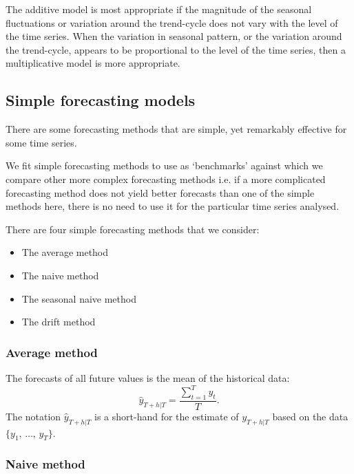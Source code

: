       \vspace{1em}

      The additive model is most appropriate if the magnitude of the seasonal fluctuations or variation around the trend-cycle does not vary with the level of the time series. When the variation in seasonal pattern, or the variation around the trend-cycle, appears to be proportional to the level of the time series, then a multiplicative model is more appropriate. 

   \subsection{Simple forecasting models}

      \cite{Watson2025} There are some forecasting methods that are simple, yet remarkably effective for some time series.

      \vspace{1em}
      
      We fit simple forecasting methods to use as `benchmarks' against which we compare other more complex forecasting methods i.e. if a more complicated forecasting method does not yield better forecasts than one of the simple methods here, there is no need to use it for the particular time series analysed.

      \vspace{1em}

      There are four simple forecasting methods that we consider:
      \begin{itemize}
         \item The average method
         \item The naive method
         \item The seasonal naive method
         \item The drift method
      \end{itemize}

      \subsubsection{Average method}

         The forecasts of all future values is the mean of the historical data: \[\hat{y}_{T+h|T} = \frac{\sum_{t=1}^{T} y_{t}}{T}.\]
         The notation \(\hat{y}_{T+h|T}\) is a short-hand for the estimate of \(y_{T+h|T}\) based on the data \(\{y_{1},\, \ldots,\, y_{T}\}\).

      \subsubsection{Naive method}

